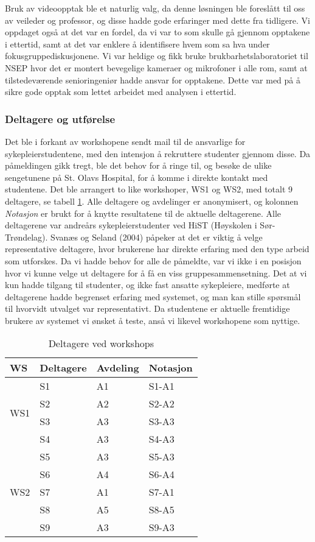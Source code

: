 \noindent
Bruk av videoopptak ble et naturlig valg, da denne løsningen ble foreslått til oss av veileder og professor, og disse hadde gode erfaringer med dette fra tidligere. Vi oppdaget også at det var en fordel, da vi var to som skulle gå gjennom opptakene i ettertid, samt at det var enklere å identifisere hvem som sa hva under fokusgruppediskusjonene. 
Vi var heldige og fikk bruke brukbarhetslaboratoriet til NSEP hvor det er montert bevegelige kameraer og mikrofoner i alle rom, samt at tilstedeværende senioringeniør hadde ansvar for opptakene. Dette var med på å sikre gode opptak som lettet arbeidet med analysen i ettertid.

\subsubsection{Deltagere og utførelse}
\label{deltagere}
Det ble i forkant av workshopene sendt mail til de ansvarlige for sykepleierstudentene, med den intensjon å rekruttere studenter gjennom disse. Da påmeldingen gikk tregt, ble det behov for å ringe til, og besøke de ulike sengetunene på St. Olavs Hospital, for å komme i direkte kontakt med studentene. 
Det ble arrangert to like workshoper, WS1 og WS2, med totalt 9 deltagere, se tabell \ref{Deltagere_WS}. Alle deltagere og avdelinger er anonymisert, og kolonnen \emph{Notasjon} er brukt for å knytte resultatene til de aktuelle deltagerene. Alle deltagerene var andreårs sykepleierstudenter ved HiST (Høyskolen i Sør-Trøndelag). Svanæs og Seland (2004) påpeker at det er viktig å velge representative deltagere, hvor brukerene har direkte erfaring med den type arbeid som utforskes. Da vi hadde behov for alle de påmeldte, var vi ikke i en posisjon hvor vi kunne velge ut deltagere for å få en viss gruppesammensetning. Det at vi kun hadde tilgang til studenter, og ikke fast ansatte sykepleiere, medførte at deltagerene hadde begrenset erfaring med systemet, og man kan stille spørsmål til hvorvidt utvalget var representativt. Da studentene er aktuelle fremtidige brukere av systemet vi ønsket å teste, anså vi likevel workshopene som nyttige.

\begin{table}[H]
\centering
\begin{tabular}{ |l|l|l|l| }
\hline
WS & Deltagere & Avdeling & Notasjon \\ \hline
\multirow{4}{*}{WS1} & S1 & A1 & S1-A1 \\
 & S2 & A2 & S2-A2 \\
 & S3 & A3 & S3-A3 \\
 & S4 & A3 & S4-A3 \\ \hline
\multirow{5}{*}{WS2} & S5 & A3 & S5-A3 \\
 & S6 & A4 & S6-A4 \\
 & S7 & A1 & S7-A1 \\
 & S8 & A5 & S8-A5 \\
 & S9 & A3 & S9-A3 \\ 
\hline
\end{tabular}
\label{Deltagere_WS}
\caption{Deltagere ved workshops}
\end{table}

